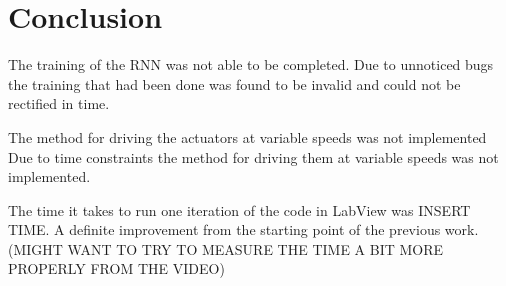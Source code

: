 \section{Conclusion}
\blindtext

The training of the RNN was not able to be completed.
Due to unnoticed bugs the training that had been done was found to be invalid and could not be rectified in time.


The method for driving the actuators at variable speeds was not implemented
Due to time constraints the method for driving them at variable speeds was not implemented.


The time it takes to run one iteration of the code in LabView was INSERT TIME.
A definite improvement from the starting point of the previous work. (MIGHT WANT TO TRY TO MEASURE THE TIME A BIT MORE
PROPERLY FROM THE VIDEO)
